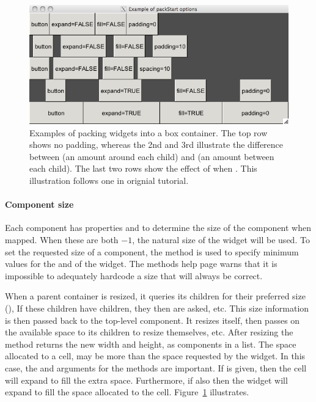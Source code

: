 \begin{figure}
  \centering
  \includegraphics[width=.85\textwidth]{ex-RGtk2-pack-start}
  \caption{Examples of packing widgets into a box container. The top
    row shows no padding, whereas the 2nd and 3rd illustrate the
    difference between  (an amount around each child)
    and  (an amount between each child). The last two
    rows show the effect of  when . This illustration
    follows one in orignial \GTK\/ tutorial.}
  \label{fig:RGtk2-pack-start}
\end{figure}




\paragraph{Component size}
Each component has properties  and  to determine the size of the component when mapped. When these are both $-1$, the natural size of the widget will be used. To set the requested size of a component, the method  is used to specify minimum values for the and  of the widget. The methods help page warns that it is impossible to adequately hardcode a size that will always be correct.

When a parent container is resized, it queries its children for their
preferred size (), If these children
have children, they then are asked, etc. This size
information is then passed back to the top-level component. It resizes
itself, then passes on the available space to its children to resize
themselves, etc. After resizing the 
method returns the new width and height, as components in a list.
The space allocated to a cell, may be more than the space requested by
the widget. In this case, the  and
 arguments for the  methods
are important. If  is given, then the cell will
expand to fill the extra space. Furthermore, if also  then
the widget will expand to fill the space allocated to the cell.
Figure~\ref{fig:RGtk2-pack-start} illustrates.


